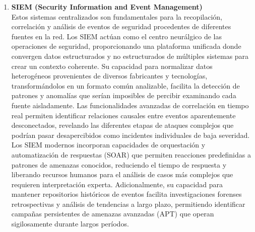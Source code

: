 \begin{enumerate}
\item \textbf{SIEM (Security Information and Event Management)} \\
Estos sistemas centralizados son fundamentales para la recopilación, correlación y análisis de eventos de seguridad procedentes de diferentes fuentes en la red. Los SIEM actúan como el centro neurálgico de las operaciones de seguridad, proporcionando una plataforma unificada donde convergen datos estructurados y no estructurados de múltiples sistemas para crear un contexto coherente. Su capacidad para normalizar datos heterogéneos provenientes de diversos fabricantes y tecnologías, transformándolos en un formato común analizable, facilita la detección de patrones y anomalías que serían imposibles de percibir examinando cada fuente aisladamente. Las funcionalidades avanzadas de correlación en tiempo real permiten identificar relaciones causales entre eventos aparentemente desconectados, revelando las diferentes etapas de ataques complejos que podrían pasar desapercibidos como incidentes individuales de baja severidad. Los SIEM modernos incorporan capacidades de orquestación y automatización de respuestas (SOAR) que permiten reacciones predefinidas a patrones de amenazas conocidos, reduciendo el tiempo de respuesta y liberando recursos humanos para el análisis de casos más complejos que requieren interpretación experta. Adicionalmente, su capacidad para mantener repositorios históricos de eventos facilita investigaciones forenses retrospectivas y análisis de tendencias a largo plazo, permitiendo identificar campañas persistentes de amenazas avanzadas (APT) que operan sigilosamente durante largos períodos.
\end{enumerate}

